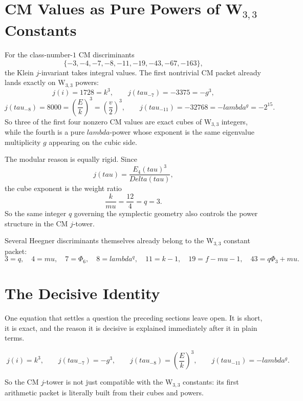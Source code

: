 \documentclass[12pt,a4paper]{article}
\def\Delta{Delta}%
\def\lambda{lambda}%
\def\mu{mu}%
\def\Phi#1{Phi#1}%
\def\tau{tau}%
\theoremstyle{definition}
\begin{document}
\section*{CM Values as Pure Powers of W$_{3,3}$ Constants}

For the class-number-$1$ CM discriminants
\[
\{-3,-4,-7,-8,-11,-19,-43,-67,-163\},
\]
the Klein $j$-invariant takes integral values.  The first nontrivial CM packet
already lands exactly on W$_{3,3}$ powers:
\[
j(i) = 1728 = k^3,
\qquad
j(\tau_{-7}) = -3375 = -g^3,
\]
\[
j(\tau_{-8}) = 8000 = \left(\frac{E}{k}\right)^3 = \left(\frac{v}{2}\right)^3,
\qquad
j(\tau_{-11}) = -32768 = -\lambda^g = -2^{15}.
\]
So three of the first four nonzero CM values are exact cubes of W$_{3,3}$
integers, while the fourth is a pure $\lambda$-power whose exponent is the same
eigenvalue multiplicity $g$ appearing on the cubic side.

The modular reason is equally rigid.  Since
\[
j(\tau) = \frac{E_4(\tau)^3}{\Delta(\tau)},
\]
the cube exponent is the weight ratio
\[
\frac{k}{\mu} = \frac{12}{4} = q = 3.
\]
So the same integer $q$ governing the symplectic geometry also controls the
power structure in the CM $j$-tower.

Several Heegner discriminants themselves already belong to the W$_{3,3}$
constant packet:
\[
3=q,
\quad
4=\mu,
\quad
7=\Phi_6,
\quad
8=\lambda^q,
\quad
11=k-1,
\quad
19=f-\mu-1,
\quad
43=q\Phi_3+\mu.
\]

\section*{The Decisive Identity}

\begin{plainbox}
One equation that settles a question the preceding sections leave open. It is short,
it is exact, and the reason it is decisive is explained immediately after it in plain
terms.
\end{plainbox}


\[
\boxed{\;
j(i)=k^3,
\qquad
j(\tau_{-7})=-g^3,
\qquad
j(\tau_{-8})=\left(\frac{E}{k}\right)^3,
\qquad
j(\tau_{-11})=-\lambda^g.
\;}
\]

So the CM $j$-tower is not just compatible with the W$_{3,3}$ constants: its
first arithmetic packet is literally built from their cubes and powers.

\clearpage
\end{document}
